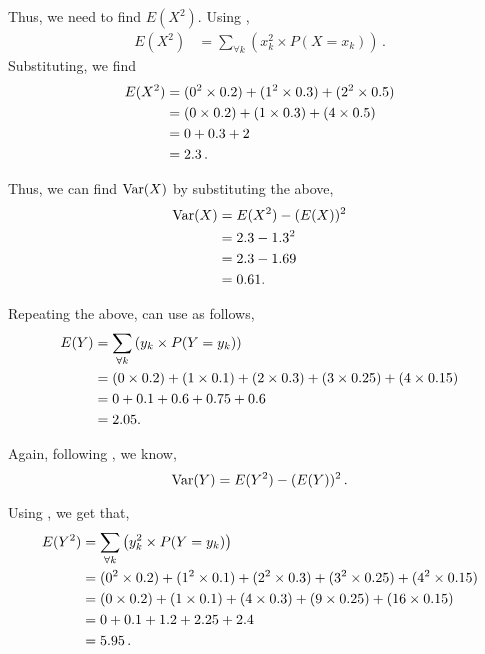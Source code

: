 \begin{subquestions}
\begin{subsubquestions}
\begin{subsubsubquestions}
Thus, we need to find $E(X^2)$. Using ,
\begin{align}
	E(X^2) & = \sum_{\forall k} \left(x^2_k \times P(X=x_k) \right) \,.
\end{align}
Substituting, we find 
\begin{align}
	E(X^2) & = (0^2 \times 0.2) + (1^2 \times 0.3) + (2^2 \times 0.5)  \nonumber \\
	       & = (0 \times 0.2) + (1 \times 0.3) + (4 \times 0.5)  \nonumber \\
	       & = 0 + 0.3 + 2  \nonumber \\
	       & = 2.3 \,.
\end{align}

Thus, we can find $\text{Var}(X)$ by substituting the above,
	\begin{align}
		\text{Var}(X) & = E(X^2) - (E(X))^2 \nonumber \\
		& = 2.3 - 1.3^2 \nonumber \\
		& = 2.3 - 1.69 \nonumber \\
		& = 0.61.
	\end{align}
		
\subsubsubquestion

Repeating the above, can use  as follows,
\begin{align}
	E(Y) & =  \sum_{\forall k} \left(y_k \times P(Y=y_k) \right) \nonumber \\
	& = (0 \times 0.2)+(1 \times 0.1)+(2 \times 0.3)+(3 \times 0.25)+(4 \times 0.15)\nonumber \\
	& = 0 + 0.1 + 0.6 + 0.75 + 0.6 \nonumber \\
	& = 2.05.
\end{align}

\subsubsubquestion

Again, following , we know,
\begin{equation}
	\text{Var}(Y) = E(Y^2) - (E(Y))^2 \,.
\end{equation}

Using , we get that,
\begin{align}
	E(Y^2) & =  \sum_{\forall k} \left(y^2_k \times P(Y=y_k) \right) \nonumber \\
	       & = (0^2 \times 0.2) + (1^2 \times 0.1) + (2^2 \times 0.3) + (3^2 \times 0.25) + (4^2 \times 0.15) \nonumber \\
	       & = (0 \times 0.2) + (1 \times 0.1) + (4 \times 0.3) + (9 \times 0.25) + (16 \times 0.15) \nonumber \\
	       & = 0 + 0.1 + 1.2 + 2.25 + 2.4 \nonumber \\
	       & = 5.95 \,.
\end{align}


\end{subsubsubquestions}
\end{subsubquestions}
\end{subquestions}
